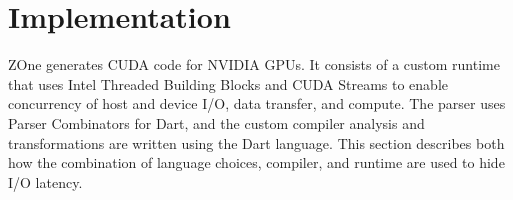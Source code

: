 \section{Implementation}

ZOne generates CUDA code for NVIDIA GPUs.
It consists of a custom
runtime that uses Intel Threaded Building Blocks and CUDA Streams to enable
concurrency of host and device I/O, data transfer, and compute. The parser
uses Parser Combinators for Dart\cite{dartParsers}, and the custom compiler
analysis and transformations are written using the Dart language.
This section describes both how the combination of language choices, compiler, and runtime are used to hide
I/O latency.





